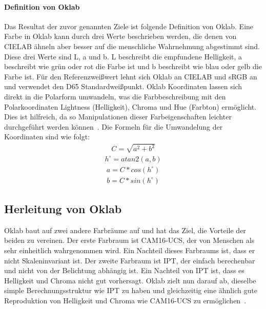 \documentclass[12pt, a4paper, ngerman]{article}
\begin{document}
\paragraph{Definition von Oklab}
Das Resultat der zuvor genannten Ziele ist folgende Definition von Oklab.
Eine Farbe in Oklab kann durch drei Werte beschrieben werden, die denen von CIELAB ähneln 
aber besser auf die menschliche Wahrnehmung abgestimmt sind.
Diese drei Werte sind L, a und b. 
L beschreibt die empfundene Helligkeit, a beschreibt wie grün oder rot die Farbe ist und b beschreibt wie blau oder gelb die Farbe ist.
Für den Referenzweißwert lehnt sich Oklab an CIELAB und sRGB an und verwendet den D65 Standardweißpunkt.
Oklab Koordinaten lassen sich direkt in die Polarform umwandeln, 
was die Farbbeschreibung mit den Polarkoordinaten Lightness (Helligkeit), Chroma und Hue (Farbton) ermöglicht.
Dies ist hilfreich, da so Manipulationen dieser Farbeigenschaften leichter durchgeführt werden können~\cite{Oklab_2020}.
Die Formeln für die Umwandelung der Koordinaten sind wie folgt:
\begin{equation}
  \begin{aligned}
    C=\sqrt{ a^2 + b^2 }
  \end{aligned}
\end{equation}
\begin{equation}
  \begin{aligned}
    h^\circ = atan2\left( a, b \right)
  \end{aligned}
\end{equation}
\begin{equation}
  \begin{aligned}
    a = C*cos\left( h^\circ \right)
  \end{aligned}
\end{equation}
\begin{equation}
  \begin{aligned}
    b = C*sin\left( h^\circ \right)
  \end{aligned}
\end{equation}


\subsection{Herleitung von Oklab}
Oklab baut auf zwei andere Farbräume auf und hat das Ziel, die Vorteile der beiden zu vereinen.
Der erste Farbraum ist \acs{CAM}16-UCS, der von Menschen als sehr einheitlich wahrgenommen wird.
Ein Nachteil dieses Farbraums ist, dass er nicht Skaleninvariant ist.
Der zweite Farbraum ist IPT, der einfach berechenbar und nicht von der Belichtung abhängig ist.
Ein Nachteil von IPT ist, dass es Helligkeit und Chroma nicht gut vorhersagt.
Oklab zielt nun darauf ab, dieselbe simple Berechnungsstruktur wie IPT zu haben und 
gleichzeitig eine ähnlich gute Reproduktion von Helligkeit und Chroma wie CAM16-UCS zu ermöglichen~\cite{Oklab_2020}.
\end{document}
